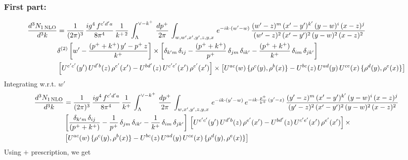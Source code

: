 \documentclass[9pt]{article}
\numberwithin{equation}{section}
\begin{document}
\subsubsection{First part:\,}
\begin{align}
     \frac{d^{3}N_{1\,\rm NLO}}{d^{3}k} & =  \frac{1}{(2\pi)^{3}}\,\frac{ig^{4}\,f^{c'd'a}}{8\pi^{4}}\, \frac{1}{k^{+\,2}}\,\int_{\Lambda}^{\vee-k^{+}}\, \frac{dp^{+}}{2\pi}\, \int_{w,w',x',y',z,y,x}\, e^{-ik\cdot (w'-w)}\, \frac{(w'-z)^{m}\,(x'-y')^{k'}\,(y-w)^{i}\,(x-z)^{j}}{(w'-z)^{2}\,(x'-y')^{2}\,(y-w)^{2}\,(x-z)^{2}}\notag \\ & \delta^{(2)}\left[w'-\frac{(p^{+}+k^{+})\,y'-p^{+}\,z}{k^{+}}\right]\times \left[\delta_{k'm}\,\delta_{ij}-\frac{(p^{+}+k^{+})}{p^{+}}\,\delta_{jm}\,\delta_{ik'}-\frac{(p^{+}+k^{+})}{k^{+}}\, \delta_{im}\, \delta_{jk'}\right]\notag \\ & \left[U^{e'c'}(y')\,U^{d'b}(z)\,\rho^{e'}(x')-U^{bd'}(z)\,U^{c'e'}(x')\,\rho^{e'}(x')\right]\times \left[U^{ac}(w)\, \{\rho^{c}(y),\rho^{b}(x)\}-U^{bc}(z)\,U^{ad}(y)\,U^{ce}(x)\,\{\rho^{d}(y),\rho^{e}(x)\}\right]
\end{align}
Integrating w.r.t. $w'$
\begin{align}
     \frac{d^{3}N_{1\,\rm NLO}}{d^{3}k} & = \frac{1}{(2\pi)^{3}}\, \frac{ig^{4}\,f^{c'd'a}}{8\pi^{4}}\, \frac{1}{k^{+}}\,\int_{\Lambda}^{\vee-k^{+}}\,  \frac{dp^{+}}{2\pi}\, \int_{w,x',y',z,y,x}\, e^{-ik\cdot (y'-w)}\, e^{-ik\cdot \frac{p^{+}}{k^{+}}\,(y'-z)}\,\frac{(y'-z)^{m}\,(x'-y')^{k'}\,(y-w)^{i}\,(x-z)^{j}}{(y'-z)^{2}\,(x'-y')^{2}\,(y-w)^{2}\,(x-z)^{2}}\notag \\ & \left[\frac{\delta_{k'm}\,\delta_{ij}}{(p^{+}+k^{+})}-\frac{1}{p^{+}}\,\delta_{jm}\,\delta_{ik'}-\frac{1}{k^{+}}\, \delta_{im}\, \delta_{jk'}\right]\, \left[U^{e'c'}(y')\,U^{d'b}(z)\,\rho^{e'}(x')-U^{bd'}(z)\,U^{c'e'}(x')\,\rho^{e'}(x')\right]\times\notag \\ &  \left[U^{ac}(w)\, \{\rho^{c}(y),\rho^{b}(x)\}-U^{bc}(z)\,U^{ad}(y)\,U^{ce}(x)\,\{\rho^{d}(y),\rho^{e}(x)\}\right]
\end{align} 
Using $+$ prescription, we get
\end{document}
